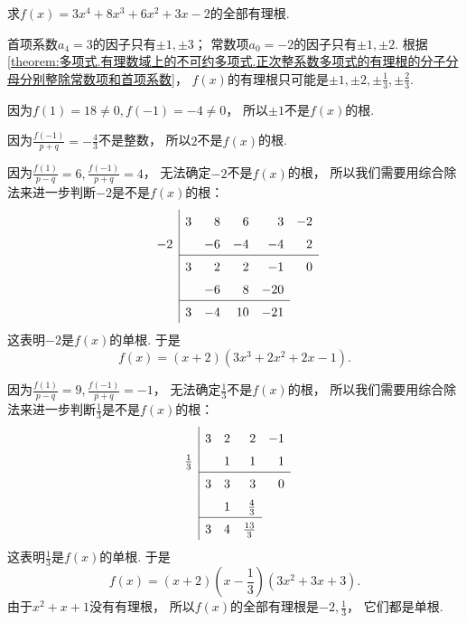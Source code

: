 \begin{example}
求\(f(x)=3x^4+8x^3+6x^2+3x-2\)的全部有理根.
\begin{solution}
首项系数\(a_4=3\)的因子只有\(\pm1,\pm3\)；
常数项\(a_0=-2\)的因子只有\(\pm1,\pm2\).
根据\cref{theorem:多项式.有理数域上的不可约多项式.正次整系数多项式的有理根的分子分母分别整除常数项和首项系数}，
\(f(x)\)的有理根只可能是\(\pm1,\pm2,\pm\frac13,\pm\frac23\).

因为\(f(1)=18\neq0,
f(-1)=-4\neq0\)，
所以\(\pm1\)不是\(f(x)\)的根.

因为\(\frac{f(-1)}{p+q}=-\frac43\)不是整数，
所以\(2\)不是\(f(x)\)的根.

因为\(\frac{f(1)}{p-q}=6,
\frac{f(-1)}{p+q}=4\)，
无法确定\(-2\)不是\(f(x)\)的根，
所以我们需要用综合除法来进一步判断\(-2\)是不是\(f(x)\)的根：\[
	\begin{array}{r|*5r}
		& 3 & 8 & 6 & 3 & -2 \\
		-2 && -6 & -4 & -4 & 2 \\ \cline{2-6}
		& 3 & 2 & 2 & -1 & 0 \\
		&& -6 & 8 & -20 \\ \cline{2-5}
		& 3 & -4 & 10 & -21
	\end{array}
\]
这表明\(-2\)是\(f(x)\)的单根.
于是\[
	f(x)=(x+2)(3x^3+2x^2+2x-1).
\]

因为\(\frac{f(1)}{p-q}=9,
\frac{f(-1)}{p+q}=-1\)，
无法确定\(\frac13\)不是\(f(x)\)的根，
所以我们需要用综合除法来进一步判断\(\frac13\)是不是\(f(x)\)的根：\[
	\def\arraystretch{1.5}
	\begin{array}{r|*5r}
		& 3 & 2 & 2 & -1 \\
		\frac13 && 1 & 1 & 1 \\ \cline{2-5}
		& 3 & 3 & 3 & 0 \\
		&& 1 & \frac43 \\ \cline{2-4}
		& 3 & 4 & \frac{13}3
	\end{array}
\]
这表明\(\frac13\)是\(f(x)\)的单根.
于是\[
	f(x)=(x+2)\left(x-\frac13\right)
	(3x^2+3x+3).
\]
由于\(x^2+x+1\)没有有理根，
所以\(f(x)\)的全部有理根是\(-2,\frac13\)，
它们都是单根.
\end{solution}
\end{example}
